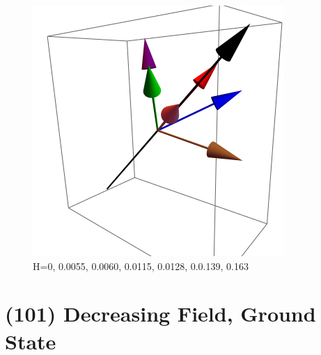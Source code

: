 \documentclass{article}
\begin{document}
\begin{figure}[ht]
\includegraphics[scale=0.29]{HVariedData/Pictures/101Inc38S.png}
\caption{H=0, 0.0055, 0.0060, 0.0115, 0.0128, 0.0.139, 0.163}
\end{figure}
\clearpage

\section{(101) Decreasing Field, Ground State}
\end{document}
